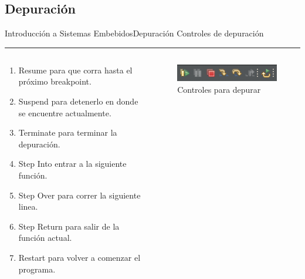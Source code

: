 \documentclass[aspectratio=169, xcolor=dvipsnames]{beamer}
\begin{document}
\subsection{Depuración}
\begin{frame}{Introducción a Sistemas Embebidos}{Depuración}
Controles de depuración
\noindent\rule{\textwidth}{0.75pt}
\begin{columns}
\begin{column}{0.7\textwidth}
\begin{enumerate}
    \item Resume para que corra hasta el próximo breakpoint.
    \item Suspend para detenerlo en donde se encuentre actualmente.
    \item Terminate para terminar la depuración.
    \item Step Into entrar a la siguiente función.
    \item Step Over para correr la siguiente linea.
    \item Step Return para salir de la función actual.
    \item Restart para volver a comenzar el programa.
\end{enumerate}
\end{column}
\begin{column}{0.3\textwidth}
\begin{figure}
\includegraphics[width=\linewidth]{resources/images/debug.png}
\caption{Controles para depurar}
\end{figure}
\end{column}
\end{columns}
\end{frame}
\end{document}
